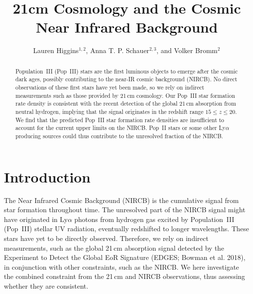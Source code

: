 \documentclass[11pt,twoside]{article}
\begin{document}
\title{21cm Cosmology and the Cosmic Near Infrared Background}
\author{Lauren Higgins$^{1,2}$, Anna T. P. Schauer$^{2,3}$, and Volker Bromm$^2$\\
}

\begin{abstract}
Population~III (Pop~III) stars are the first luminous objects to emerge after the cosmic dark ages, possibly contributing to the near-IR cosmic background (NIRCB). No direct observations of these first stars have yet been made, so we rely on indirect measurements such as those provided by 21\,cm cosmology. Our Pop~III star formation rate density is consistent with the recent detection of the global 21\,cm absorption from neutral hydrogen, implying that the signal originates in the redshift range $15 \le z \le 20$. We find that the predicted Pop~III star formation rate densities are insufficient to account for the current upper limits on the NIRCB. Pop~II stars or some other Ly$\alpha$ producing sources could thus contribute to the unresolved fraction of the NIRCB.
\end{abstract}

\section{Introduction}

The Near Infrared Cosmic Background (NIRCB) is the cumulative signal from star formation throughout time. The
unresolved part of the NIRCB signal might have originated in Ly$\alpha$ photons from hydrogen gas excited by 
Population~III (Pop~III) stellar UV radiation, eventually redshifted to longer wavelengths. These stars have 
yet to be directly observed. Therefore, we rely on indirect measurements, such as the global 21\,cm 
absorption signal detected by the Experiment to Detect the Global EoR Signature (EDGES; Bowman et al. 2018), 
in conjunction with other constraints, such as the NIRCB. We here investigate the combined constraint from 
the 21\,cm and NIRCB observations, thus assessing whether they are consistent.
\end{document}
